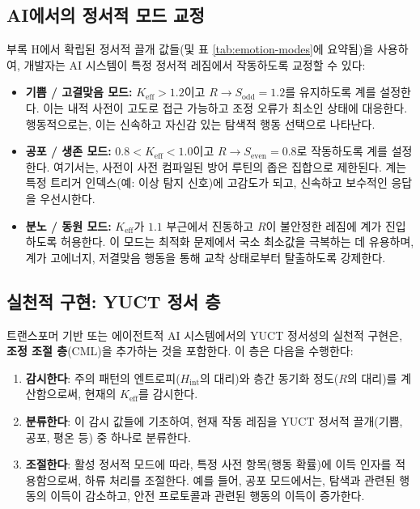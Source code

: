 \documentclass[12pt,a4paper]{article}
\begin{document}
	\subsection{AI에서의 정서적 모드 교정}
	
	부록 H에서 확립된 정서적 끌개 값들(및 표 \ref{tab:emotion-modes}에 요약됨)을 사용하여, 개발자는 AI 시스템이 특정 정서적 레짐에서 작동하도록 교정할 수 있다:
	
	\begin{itemize}
		\item \textbf{기쁨 / 고결맞음 모드:} \(K_{\mathrm{eff}} > 1.2\)이고 \(R \to S_{\mathrm{odd}} = 1.2\)를 유지하도록 계를 설정한다. 이는 내적 사전이 고도로 접근 가능하고 조정 오류가 최소인 상태에 대응한다. 행동적으로는, 이는 신속하고 자신감 있는 탐색적 행동 선택으로 나타난다.
		\item \textbf{공포 / 생존 모드:} \(0.8 < K_{\mathrm{eff}} < 1.0\)이고 \(R \to S_{\mathrm{even}} = 0.8\)로 작동하도록 계를 설정한다. 여기서는, 사전이 사전 컴파일된 방어 루틴의 좁은 집합으로 제한된다. 계는 특정 트리거 인덱스(예: 이상 탐지 신호)에 고감도가 되고, 신속하고 보수적인 응답을 우선시한다.
		\item \textbf{분노 / 동원 모드:} \(K_{\mathrm{eff}}\)가 \(1.1\) 부근에서 진동하고 \(R\)이 불안정한 레짐에 계가 진입하도록 허용한다. 이 모드는 최적화 문제에서 국소 최소값을 극복하는 데 유용하며, 계가 고에너지, 저결맞음 행동을 통해 교착 상태로부터 탈출하도록 강제한다.
	\end{itemize}
	
	\subsection{실천적 구현: YUCT 정서 층}
	
	트랜스포머 기반 또는 에이전트적 AI 시스템에서의 YUCT 정서성의 실천적 구현은, \textbf{조정 조절 층}(CML)을 추가하는 것을 포함한다. 이 층은 다음을 수행한다:
	
	\begin{enumerate}
		\item \textbf{감시한다}: 주의 패턴의 엔트로피(\(H_{\mathrm{int}}\)의 대리)와 층간 동기화 정도(\(R\)의 대리)를 계산함으로써, 현재의 \(K_{\mathrm{eff}}\)를 감시한다.
		\item \textbf{분류한다}: 이 감시 값들에 기초하여, 현재 작동 레짐을 YUCT 정서적 끌개(기쁨, 공포, 평온 등) 중 하나로 분류한다.
		\item \textbf{조절한다}: 활성 정서적 모드에 따라, 특정 사전 항목(행동 확률)에 이득 인자를 적용함으로써, 하류 처리를 조절한다. 예를 들어, 공포 모드에서는, 탐색과 관련된 행동의 이득이 감소하고, 안전 프로토콜과 관련된 행동의 이득이 증가한다.
	\end{enumerate}
	
\end{document}
